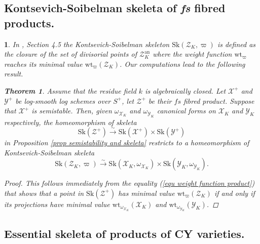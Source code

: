 \documentclass{amsart}%
\numberwithin{equation}{subsection}
\theoremstyle{plain2}
\newtheorem{thm}[equation]{Theorem}
\newtheorem{cor}[equation]{Corollary}
\theoremstyle{definition2}
\theoremstyle{stepstyle}
\theoremstyle{point}
\theoremstyle{subpoint}
\newtheorem{subpoint}[equation]{}%
\newcommand{\spa}[1]{\begin{subpoint}#1\end{subpoint}}           %
\newcommand{\cX}{\ensuremath{\mathscr{X}}}
\newcommand{\cY}{\ensuremath{\mathscr{Y}}}
\newcommand{\cZ}{\ensuremath{\mathscr{Z}}}
\renewcommand{\cZ}{\ensuremath{\mathscr{Z}}}
\renewcommand{\cY}{\ensuremath{\mathscr{Y}}}
\newcommand{\weight}{\mathrm{wt}}
\newcommand{\Sk}{\mathrm{Sk}}
\begin{document}
\subsection{Kontsevich-Soibelman skeleta of \textit{fs} fibred products.}
\spa{In \cite{MustataNicaise}, Section 4.5 the Kontsevich-Soibelman skeleton $\Sk(\cZ_K, \varpi)$ is defined as the closure of the set of divisorial points of $\cZ_K^\text{an}$ where the weight function $\weight_\varpi$ reaches its minimal value $\weight_{\varpi}(\cZ_K)$. Our computations lead to the following result.
\begin{thm}
%
\label{thm semistability and KS skeleta}
Assume that the residue field $k$ is algebraically closed. Let $\cX^+$ and $\cY^+$ be log-smooth log schemes over $S^+$, let $\cZ^+$ be their $fs$ fibred product. Suppose that $\cX^+$ is semistable. Then, given $\omega_{\cX_K}$ and $\omega_{\cY_K}$ canonical forms on $\cX_K$ and $\cY_K$ respectively, the homeomorphism of skeleta $$\Sk(\cZ^+) \xrightarrow{\sim} \Sk(\cX^+) \times \Sk(\cY^+)$$ in Proposition \ref{prop semistability and skeleta} restricts to a homeomorphism of Kontsevich-Soibelman skeleta $$\Sk(\cZ_K, \varpi) \xrightarrow{\sim} \Sk(\cX_K, \omega_{\cX_K}) \times \Sk(\cY_K, \omega_{\cY_K}).$$ 
\end{thm}
\begin{proof}
This follows immediately from the equality (\ref{equ weight function product}) that shows that a point in $\Sk(\cZ^+)$ has minimal value $\weight_{\varpi}(\cZ_K)$ if and only if its projections have minimal value $\weight_{\omega_{\cX_K}}(\cX_K)$ and $\weight_{\omega_{\cY_K}}(\cY_K)$.
\end{proof}
}

\subsection{Essential skeleta of products of CY varieties.}
\end{document}
